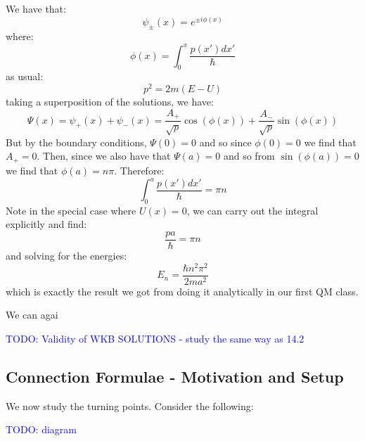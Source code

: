 We have that:
\begin{equation}
    \psi_\pm (x) = e^{\pm i\phi(x)}
\end{equation}
where:
\begin{equation}
    \phi(x) = \int_0^x \frac{p(x')dx'}{\hbar}
\end{equation}
as usual:
\begin{equation}
    p^2 = 2m(E - U)
\end{equation}
taking a superposition of the solutions, we have:
\begin{equation}
    \Psi(x) = \psi_+(x) + \psi_-(x) = \frac{A_+}{\sqrt{p}}\cos(\phi(x)) + \frac{A_-}{\sqrt{p}}\sin(\phi(x))
\end{equation}
But by the boundary conditions, $\Psi(0) = 0$ and so since $\phi(0) = 0$ we find that $A_+ = 0$. Then, since we also have that $\Psi(a) = 0$ and so from $\sin(\phi(a)) = 0$ we find that $\phi(a) = n\pi$. Therefore:
\begin{equation}
    \int_0^a \frac{p(x')dx'}{\hbar} = \pi n
\end{equation}
Note in the special case where $U(x) = 0$, we can carry out the integral explicitly  and find:
\begin{equation}
    \frac{pa}{\hbar} = \pi n
\end{equation}
and solving for the energies:
\begin{equation}
    E_n = \frac{\hbar n^2\pi^2}{2ma^2}
\end{equation}
which is exactly the result we got from doing it analytically in our first QM class.

We can agai

\textcolor{blue}{TODO: Validity of WKB SOLUTIONS - study the same way as 14.2}

\subsection{Connection Formulae - Motivation and Setup}
We now study the turning points. Consider the following:

\textcolor{blue}{TODO: diagram}


